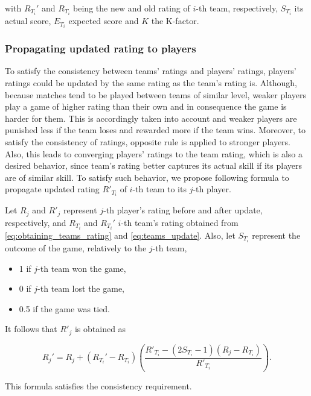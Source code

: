 \noindent with $R_{T_i}'$ and $R_{T_i}$ being the new and old rating of $i$-th team, respectively, $S_{T_i}$ its actual score, $E_{T_i}$ expected score and $K$ the K-factor.

\subsubsection{Propagating updated rating to players}
To satisfy the consistency between teams' ratings and players' ratings, players' ratings could be updated by the same rating as the team's rating is. Although, because matches tend to be played between teams of similar level, weaker players play a game of higher rating than their own and in consequence the game is harder for them. This is accordingly taken into account and weaker players are punished less if the team loses and rewarded more if the team wins. Moreover, to satisfy the consistency of ratings, opposite rule is applied to stronger players. Also, this leads to converging players' ratings to the team rating, which is also a desired behavior, since team's rating better captures its actual skill if its players are of similar skill. \linebreak To satisfy such behavior, we propose following formula to propagate updated rating $R'_{T_i}$ of $i$-th team to its $j$-th player.

\noindent
\begin{proposition}
Let $R_j$ and $R'_j$ represent $j$-th player's rating before and after update, respectively, and $R_{T_i}$ and $R_{T_i}'$ $i$-th team's rating obtained from \eqref{eq:obtaining_teams_rating} and \eqref{eq:teams_update}. Also, let $S_{T_i}$ represent the outcome of the game, relatively to the $j$-th team,

\begin{itemize}
\item 1 if $j$-th team won the game,
\item 0 if $j$-th team lost the game,
\item 0.5 if the game was tied.
\end{itemize}

\noindent It follows that $R'_j$ is obtained as

\begin{equation}
\label{eq:propagating_rating_to_players}
R_j' = R_j + (R_{T_i}' - R_{T_i})\left(\frac{R'_{T_i} - (2S_{T_i}-1)(R_j-R_{T_i})}{R'_{T_i}}\right).
\end{equation}

\noindent This formula satisfies the consistency requirement.
\end{proposition}

